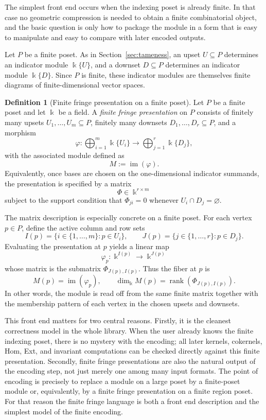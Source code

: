 \documentclass[11pt]{article}
\newcommand{\kk}{\Bbbk}
\theoremstyle{definition}
\newtheorem{defn}[theorem]{Definition}
\theoremstyle{remark}
\begin{document}
The simplest front end occurs when the indexing poset is already finite.  In that case no geometric compression is needed to obtain a finite combinatorial object, and the basic question is only how to package the module in a form that is easy to manipulate and easy to compare with later encoded outputs.

Let \(P\) be a finite poset.  As in Section~\ref{sec:tameness}, an upset \(U \subseteq P\) determines an indicator module \(\kk\{U\}\), and a downset \(D \subseteq P\) determines an indicator module \(\kk\{D\}\).  Since \(P\) is finite, these indicator modules are themselves finite diagrams of finite-dimensional vector spaces.

\begin{defn}[Finite fringe presentation on a finite poset]
	Let \(P\) be a finite poset and let \(\kk\) be a field.  A \emph{finite fringe presentation} on \(P\) consists of finitely many upsets \(U_1,\dots,U_m\subseteq P\), finitely many downsets \(D_1,\dots,D_r\subseteq P\), and a morphism
	\[
	\varphi : \bigoplus_{i=1}^m \kk\{U_i\}\longrightarrow \bigoplus_{j=1}^r \kk\{D_j\},
	\]
	with the associated module defined as
	\[
	M:=\operatorname{im}(\varphi).
	\]
	Equivalently, once bases are chosen on the one-dimensional indicator summands, the presentation is specified by a matrix
	\[
	\Phi\in \kk^{r\times m}
	\]
	subject to the support condition that \(\Phi_{ji}=0\) whenever \(U_i\cap D_j=\varnothing\).
\end{defn}

The matrix description is especially concrete on a finite poset.  For each vertex \(p\in P\), define the active column and row sets
\[
I(p)=\{i\in\{1,\dots,m\}:p\in U_i\},
\qquad
J(p)=\{j\in\{1,\dots,r\}:p\in D_j\}.
\]
Evaluating the presentation at \(p\) yields a linear map
\[
\varphi_p : \kk^{I(p)}\longrightarrow \kk^{J(p)}
\]
whose matrix is the submatrix \(\Phi_{J(p),I(p)}\).  Thus the fiber at \(p\) is
\[
M(p)=\operatorname{im}(\varphi_p),
\qquad
\dim_\kk M(p)=\operatorname{rank}(\Phi_{J(p),I(p)}).
\]
In other words, the module is read off from the same finite matrix together with the membership pattern of each vertex in the chosen upsets and downsets.

This front end matters for two central reasons.  Firstly, it is the cleanest correctness model in the whole library.  When the user already knows the finite indexing poset, there is no mystery with the encoding; all later kernels, cokernels, Hom, Ext, and invariant computations can be checked directly against this finite presentation.  Secondly, finite fringe presentations are also the natural output of the encoding step, not just merely one among many input formats.  The point of encoding is precisely to replace a module on a large poset by a finite-poset module or, equivalently, by a finite fringe presentation on a finite region poset.  For that reason the finite fringe language is both a front end description and the simplest model of the finite encoding.
\end{document}
